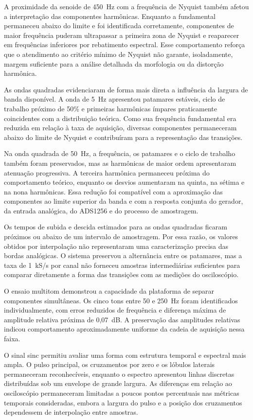 \documentclass[a4paper,12pt]{fcte}
\begin{document}
A proximidade da senoide de 450~Hz com a frequência de Nyquist também afetou a interpretação das componentes harmônicas. Enquanto a fundamental permaneceu abaixo do limite e foi identificada corretamente, componentes de maior frequência puderam ultrapassar a primeira zona de Nyquist e reaparecer em frequências inferiores por rebatimento espectral. Esse comportamento reforça que o atendimento ao critério mínimo de Nyquist não garante, isoladamente, margem suficiente para a análise detalhada da morfologia ou da distorção harmônica.

As ondas quadradas evidenciaram de forma mais direta a influência da largura de banda disponível. A onda de 5~Hz apresentou patamares estáveis, ciclo de trabalho próximo de 50\% e primeiras harmônicas ímpares praticamente coincidentes com a distribuição teórica. Como sua frequência fundamental era reduzida em relação à taxa de aquisição, diversas componentes permaneceram abaixo do limite de Nyquist e contribuíram para a representação das transições.

Na onda quadrada de 50~Hz, a frequência, os patamares e o ciclo de trabalho também foram preservados, mas as harmônicas de maior ordem apresentaram atenuação progressiva. A terceira harmônica permaneceu próxima do comportamento teórico, enquanto os desvios aumentaram na quinta, na sétima e na nona harmônicas. Essa redução foi compatível com a aproximação das componentes ao limite superior da banda e com a resposta conjunta do gerador, da entrada analógica, do ADS1256 e do processo de amostragem.

Os tempos de subida e descida estimados para as ondas quadradas ficaram próximos ou abaixo de um intervalo de amostragem. Por essa razão, os valores obtidos por interpolação não representaram uma caracterização precisa das bordas analógicas. O sistema preservou a alternância entre os patamares, mas a taxa de 1~kS/s por canal não forneceu amostras intermediárias suficientes para comparar diretamente a forma das transições com as medições do osciloscópio.

O ensaio multitom demonstrou a capacidade da plataforma de separar componentes simultâneas. Os cinco tons entre 50 e 250~Hz foram identificados individualmente, com erros reduzidos de frequência e diferença máxima de amplitude relativa próxima de 0,07~dB. A preservação das amplitudes relativas indicou comportamento aproximadamente uniforme da cadeia de aquisição nessa faixa.

O sinal sinc permitiu avaliar uma forma com estrutura temporal e espectral mais ampla. O pulso principal, os cruzamentos por zero e os lóbulos laterais permaneceram reconhecíveis, enquanto o espectro apresentou linhas discretas distribuídas sob um envelope de grande largura. As diferenças em relação ao osciloscópio permaneceram limitadas a poucos pontos percentuais nas métricas temporais consideradas, embora a largura do pulso e a posição dos cruzamentos dependessem de interpolação entre amostras.
\end{document}
